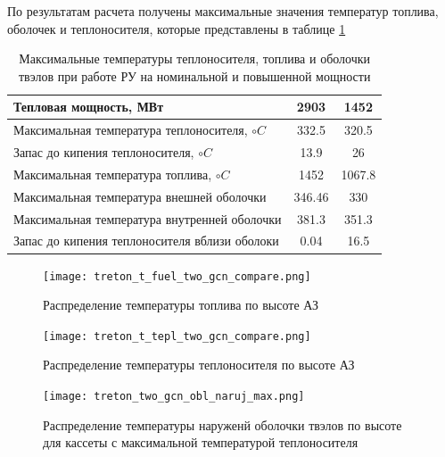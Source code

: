 По результатам расчета получены максимальные значения температур топлива, оболочек и теплоносителя, которые представлены в таблице \ref{tabular:t-two-gcn-nominal-compare}

\begin{table}[H]
    \caption{Максимальные температуры теплоносителя, топлива и оболочки твэлов при работе РУ на номинальной и повышенной мощности}
    \begin{center}
        \begin{tabular}{|l|c|c|}
        \toprule
        Тепловая мощность, МВт & 2903 & 1452 \\
        \midrule
        \hline
        Максимальная температура теплоносителя, $\circ C$ & 332.5 & 320.5  \\ 
        \hline
        Запас до кипения теплоносителя, $\circ C$ & 13.9 & 26 \\
        \hline
        Максимальная температура топлива, $\circ C$ & 1452 & 1067.8  \\
        \hline
        Максимальная температура внешней оболочки & 346.46 & 330 \\
        \hline
        Максимальная температура внутренней оболочки & 381.3 & 351.3 \\
        \hline
        Запас до кипения теплоносителя вблизи оболоки & 0.04 & 16.5 \\
        \bottomrule
        \end{tabular}
		\label{tabular:t-two-gcn-nominal-compare}
    \end{center}
\end{table}

\begin{figure}[H]
	\begin{center}
		\texttt{[image: treton\_t\_fuel\_two\_gcn\_compare.png]}
		\caption{Распределение температуры топлива по высоте АЗ}
		\label{pic:treton-t-fuel-two-gcn-compare}
	\end{center}
\end{figure}

\begin{figure}[H]
	\begin{center}
		\texttt{[image: treton\_t\_tepl\_two\_gcn\_compare.png]}
		\caption{Распределение температуры теплоносителя по высоте АЗ}
		\label{pic:treton-t-tepl-two-gcn-compare}
	\end{center}
\end{figure}

\begin{figure}[H]
	\begin{center}
		\texttt{[image: treton\_two\_gcn\_obl\_naruj\_max.png]}
		\caption{Распределение температуры наруженй оболочки твэлов по высоте для кассеты с максимальной температурой теплоносителя}
		\label{pic:treton-two-gcn-obl-naruj-max}
	\end{center}
\end{figure}

